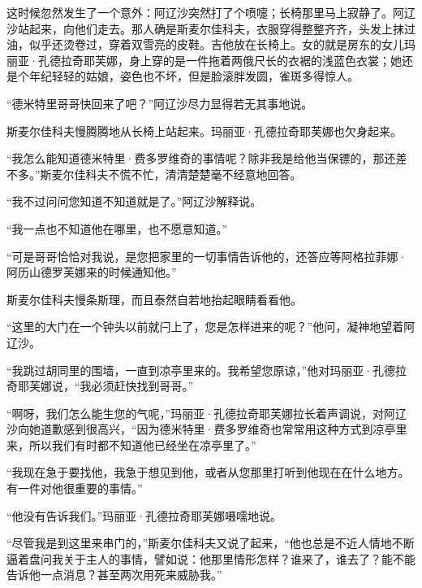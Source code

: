 \par 这时候忽然发生了一个意外：阿辽沙突然打了个喷嚏；长椅那里马上寂静了。阿辽沙站起来，向他们走去。那人确是斯麦尔佳科夫，衣服穿得整整齐齐，头发上抹过油，似乎还烫卷过，穿着双雪亮的皮鞋。吉他放在长椅上。女的就是房东的女儿玛丽亚·孔德拉奇耶芙娜，身上穿的是一件拖着两俄尺长的衣裾的浅蓝色衣裳；她还是个年纪轻轻的姑娘，姿色也不坏，但是脸滚胖发圆，雀斑多得惊人。
\par “德米特里哥哥快回来了吧？”阿辽沙尽力显得若无其事地说。
\par 斯麦尔佳科夫慢腾腾地从长椅上站起来。玛丽亚·孔德拉奇耶芙娜也欠身起来。
\par “我怎么能知道德米特里·费多罗维奇的事情呢？除非我是给他当保镖的，那还差不多。”斯麦尔佳科夫不慌不忙，清清楚楚毫不经意地回答。
\par “我不过问问您知道不知道就是了。”阿辽沙解释说。
\par “我一点也不知道他在哪里，也不愿意知道。”
\par “可是哥哥恰恰对我说，是您把家里的一切事情告诉他的，还答应等阿格拉菲娜·阿历山德罗芙娜来的时候通知他。”
\par 斯麦尔佳科夫慢条斯理，而且泰然自若地抬起眼睛看看他。
\par “这里的大门在一个钟头以前就闩上了，您是怎样进来的呢？”他问，凝神地望着阿辽沙。
\par “我跳过胡同里的围墙，一直到凉亭里来的。我希望您原谅，”他对玛丽亚·孔德拉奇耶芙娜说，“我必须赶快找到哥哥。”
\par “啊呀，我们怎么能生您的气呢，”玛丽亚·孔德拉奇耶芙娜拉长着声调说，对阿辽沙向她道歉感到很高兴，“因为德米特里·费多罗维奇也常常用这种方式到凉亭里来，所以我们有时都不知道他已经坐在凉亭里了。”
\par “我现在急于要找他，我急于想见到他，或者从您那里打听到他现在在什么地方。有一件对他很重要的事情。”
\par “他没有告诉我们。”玛丽亚·孔德拉奇耶芙娜嗫嚅地说。
\par “尽管我是到这里来串门的，”斯麦尔佳科夫又说了起来，“他也总是不近人情地不断逼着盘问我关于主人的事情，譬如说：他那里情形怎样？谁来了，谁去了？能不能告诉他一点消息？甚至两次用死来威胁我。”
